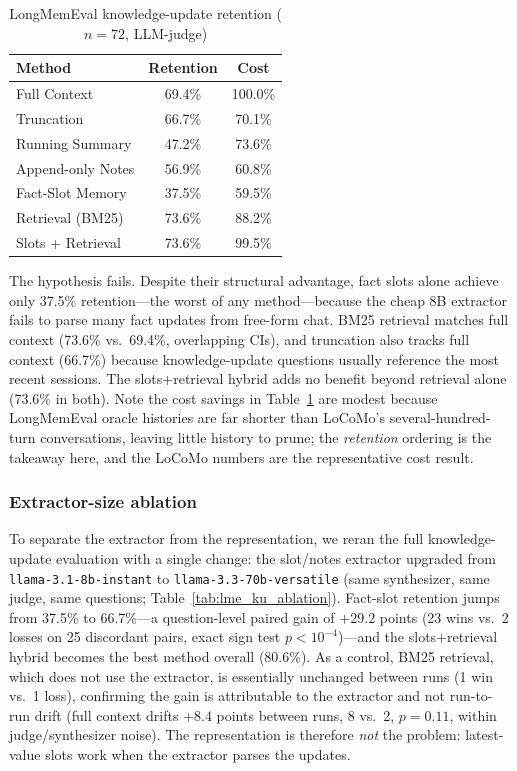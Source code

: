 \documentclass[conference]{IEEEtran}
\begin{document}
\begin{table}[h]
\centering
\caption{LongMemEval knowledge-update retention ($n=72$, LLM-judge)}
\label{tab:lme_ku}
\small
\setlength{\tabcolsep}{4pt}
\begin{tabular}{lcc}
\toprule
\textbf{Method} & \textbf{Retention} & \textbf{Cost} \\
\midrule
Full Context & 69.4\% & 100.0\% \\
Truncation & 66.7\% & 70.1\% \\
Running Summary & 47.2\% & 73.6\% \\
Append-only Notes & 56.9\% & 60.8\% \\
Fact-Slot Memory & 37.5\% & 59.5\% \\
Retrieval (BM25) & 73.6\% & 88.2\% \\
Slots + Retrieval & 73.6\% & 99.5\% \\
\bottomrule
\end{tabular}
\end{table}

The hypothesis fails. Despite their structural advantage, fact slots alone achieve only 37.5\% retention---the worst of any method---because the cheap 8B extractor fails to parse many fact updates from free-form chat. BM25 retrieval matches full context (73.6\% vs.\ 69.4\%, overlapping CIs), and truncation also tracks full context (66.7\%) because knowledge-update questions usually reference the most recent sessions. The slots+retrieval hybrid adds no benefit beyond retrieval alone (73.6\% in both). Note the cost savings in Table~\ref{tab:lme_ku} are modest because LongMemEval oracle histories are far shorter than LoCoMo's several-hundred-turn conversations, leaving little history to prune; the \emph{retention} ordering is the takeaway here, and the LoCoMo numbers are the representative cost result.

\subsubsection*{Extractor-size ablation}
To separate the extractor from the representation, we reran the full knowledge-update evaluation with a single change: the slot/notes extractor upgraded from \texttt{llama-3.1-8b-instant} to \texttt{llama-3.3-70b-versatile} (same synthesizer, same judge, same questions; Table~\ref{tab:lme_ku_ablation}). Fact-slot retention jumps from 37.5\% to 66.7\%---a question-level paired gain of $+29.2$ points (23 wins vs.\ 2 losses on 25 discordant pairs, exact sign test $p<10^{-4}$)---and the slots+retrieval hybrid becomes the best method overall (80.6\%). As a control, BM25 retrieval, which does not use the extractor, is essentially unchanged between runs (1 win vs.\ 1 loss), confirming the gain is attributable to the extractor and not run-to-run drift (full context drifts $+8.4$ points between runs, 8 vs.\ 2, $p=0.11$, within judge/synthesizer noise). The representation is therefore \emph{not} the problem: latest-value slots work when the extractor parses the updates.
\end{document}
